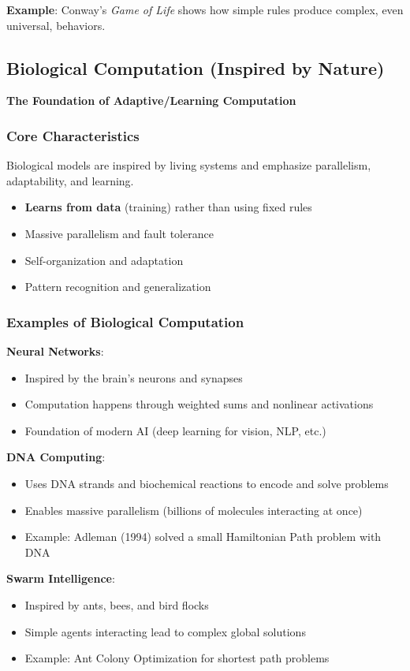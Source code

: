 \textbf{Example}: Conway's \textit{Game of Life} shows how simple rules produce complex, even universal, behaviors.

\subsection{Biological Computation (Inspired by Nature)}
\textbf{The Foundation of Adaptive/Learning Computation}

\subsubsection{Core Characteristics}
Biological models are inspired by living systems and emphasize parallelism, adaptability, and learning.
\begin{itemize}
    \item \textbf{Learns from data} (training) rather than using fixed rules
    \item Massive parallelism and fault tolerance
    \item Self-organization and adaptation
    \item Pattern recognition and generalization
\end{itemize}

\subsubsection{Examples of Biological Computation}
\textbf{Neural Networks}:
\begin{itemize}
    \item Inspired by the brain's neurons and synapses
    \item Computation happens through weighted sums and nonlinear activations
    \item Foundation of modern AI (deep learning for vision, NLP, etc.)
\end{itemize}

\textbf{DNA Computing}:
\begin{itemize}
    \item Uses DNA strands and biochemical reactions to encode and solve problems
    \item Enables massive parallelism (billions of molecules interacting at once)
    \item Example: Adleman (1994) solved a small Hamiltonian Path problem with DNA
\end{itemize}

\textbf{Swarm Intelligence}:
\begin{itemize}
    \item Inspired by ants, bees, and bird flocks
    \item Simple agents interacting lead to complex global solutions
    \item Example: Ant Colony Optimization for shortest path problems
\end{itemize}

